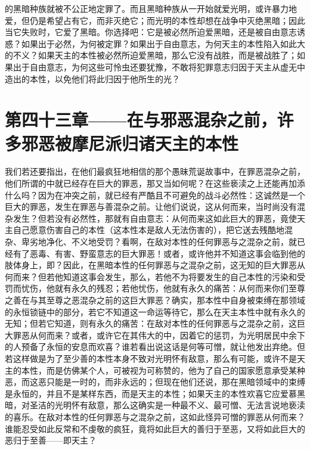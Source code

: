 的黑暗种族就被不公正地定罪了。而且黑暗种族从一开始就爱光明，或许暴力地爱，但仍是希望占有它，而非灭绝它；而光明的本性却想在战争中灭绝黑暗；因此当它失败时，它爱了黑暗。你选择吧：它是被必然所迫爱黑暗，还是被自由意志诱惑？如果出于必然，为何被定罪？如果出于自由意志，为何天主的本性陷入如此大的不义？如果天主的本性被必然所迫爱黑暗，那么它没有战胜，而是被战胜了；如果出于自由意志，为何这些可怜虫还要犹豫，不敢将犯罪意志归因于天主从虚无中造出的本性，以免他们将此归因于他所生的光？\par


\section{第四十三章——在与邪恶混杂之前，许多邪恶被摩尼派归诸天主的本性}

我们若还要指出，在他们最疯狂地相信的那个愚昧荒诞故事中，在罪恶混杂之前，他们所谓的中就已经存在巨大的罪恶，那又当如何呢？在这些亵渎之上还能再加添什么吗？因为在冲突之前，就已经有严酷且不可避免的战斗必然性：这诚然是一个巨大的罪恶，发生在罪恶与善混杂之前。让他们说说，这从何而来，当时尚没有混杂发生？但若没有必然性，那就有自由意志：从何而来这如此巨大的罪恶，竟使天主自己愿意伤害自己的本性（这本性本是敌人无法伤害的），把它送去残酷地混杂、卑劣地净化、不义地受罚？看啊，在敌对本性的任何罪恶与之混杂之前，就已经有了恶毒、有害、野蛮意志的巨大罪恶！或者，或许他并不知道这事会临到他的肢体身上，即？因此，在黑暗本性的任何罪恶与之混杂之前，这无知的巨大罪恶从何而来？但若他知道这事会发生，那么，若他不为将要发生的自己本性的污染和受罚而忧伤，他就有永久的残忍；若他忧伤，他就有永久的痛苦：从何而来你们至尊之善在与其至尊之恶混杂之前的这巨大罪恶？确实，那本性中自身被束缚在那领域的永恒锁链中的部分，若它不知道这一命运等待它，那么在天主本性中就有永久的无知；但若它知道，则有永久的痛苦：在敌对本性的任何罪恶与之混杂之前，这巨大罪恶从何而来？或者，或许它在其伟大的中，因着它的惩罚，为光明居民中余下的人预备了永恒的安息而欢喜？谁若看出说这话是何等可憎，就让他发出弃绝。但若这样做是为了至少善的本性本身不致对光明怀有敌意，那么有可能，或许不是天主的本性，而是仿佛某个人，可被视为可称赞的，他为了自己的国家愿意承受某种恶，而这恶只能是一时的，而非永远的；但现在他们还说，那在黑暗领域中的束缚是永恒的，并且不是某样东西，而是天主的本性；如果天主的本性欢喜它应爱慕黑暗，对圣洁的光明怀有敌意，那么这确实是一种最不义、最可憎、无法言说地亵渎的喜乐。在敌对本性的任何罪恶与之混杂之前，这如此怪异可憎的罪恶从何而来？谁能忍受如此反常和不虔敬的疯狂，竟将如此巨大的善归于至恶，又将如此巨大的恶归于至善——即天主？\par

